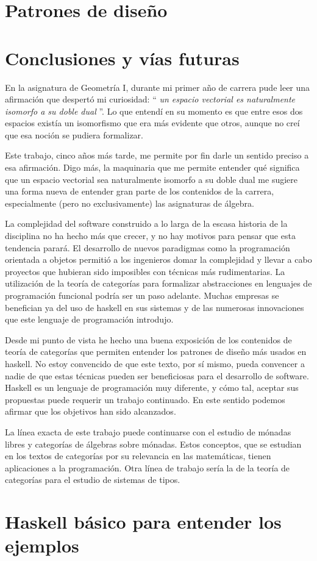 \documentclass[12pt]{book}
\begin{document}
\chapter{Patrones de diseño}


\chapter*{Conclusiones y vías futuras}
En la asignatura de Geometría I, durante mi primer año de carrera
pude leer una afirmación que despertó mi curiosidad: ``
\textit{un espacio vectorial es naturalmente isomorfo a su doble dual}
''. Lo que
entendí en su momento es que entre esos dos espacios existía
un isomorfismo que era más evidente que otros, aunque no creí
que esa noción se pudiera formalizar.

Este trabajo, cinco años más tarde, me permite por fin
darle un sentido preciso a esa afirmación. Digo más, la maquinaria
que me permite entender qué significa que un espacio vectorial
sea naturalmente isomorfo a su doble dual me
sugiere una forma nueva de entender gran parte de los contenidos
de la carrera, especialmente (pero no exclusivamente) las asignaturas
de álgebra.

La complejidad del software construido a lo larga de la escasa
historia de la disciplina no ha hecho más que crecer, y no hay motivos
para pensar que esta tendencia parará. El desarrollo de
nuevos paradigmas como la programación
orientada a objetos permitió a los ingenieros domar la complejidad
y llevar a cabo proyectos que hubieran sido imposibles con técnicas
más rudimentarias. La utilización de la teoría de categorías
para formalizar abstracciones en lenguajes de programación funcional
podría ser un paso adelante. Muchas empresas se benefician ya
del uso de haskell en sus sistemas y de las
numerosas innovaciones que este
lenguaje de programación introdujo.

Desde mi punto de vista he hecho una buena exposición de los contenidos
de teoría de categorías que permiten entender los patrones
de diseño más usados en haskell. No estoy convencido de que este
texto, por sí mismo, pueda convencer a nadie de que estas técnicas
pueden ser beneficiosas para el desarrollo de software. Haskell es
un lenguaje de programación muy diferente, y cómo tal, aceptar sus
propuestas puede requerir un trabajo continuado. En este sentido
podemos afirmar que los objetivos han sido alcanzados.

La línea exacta de este trabajo puede continuarse con el estudio
de mónadas libres y categorías de álgebras sobre mónadas. Estos
conceptos, que se estudian en los textos de categorías por su
relevancia en las matemáticas, tienen aplicaciones
a la programación. Otra línea de trabajo sería la de la teoría
de categorías para el estudio de sistemas de tipos.

\printbibliography

\appendix
\chapter[Haskell Básico]{Haskell básico para entender los ejemplos}

\end{document}
